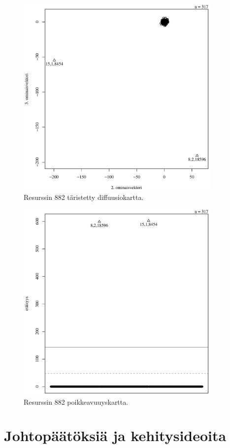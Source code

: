 \begin{figure}[p]
\centering
\includegraphics[width=10cm]{pics/diffuusiokuvat/service_882.pdf}
\caption{Resurssin 882 täristetty diffuusiokartta.}
\label{diffuusio_882}
\end{figure}

\begin{figure}[p]
\centering
\includegraphics[width=10cm]{pics/tiheyskuvat/service_882.pdf}
\caption{Resurssin 882 poikkeavuuyskartta.}
\label{service_882}
\end{figure}

\pagebreak

\section{Johtopäätöksiä ja kehitysideoita}

